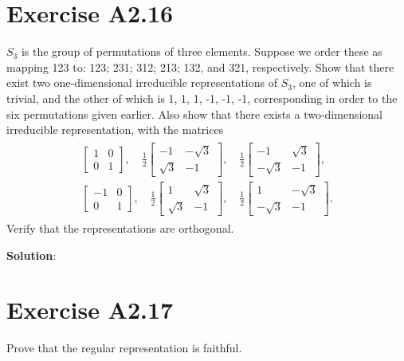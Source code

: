 \documentclass{book}
\begin{document}
\section*{Exercise A2.16}
    $S_3$ is the group of permutations of three elements. Suppose we order these as mapping 123 to: 123; 231; 312; 213; 132, and 321, respectively. Show that there exist two one-dimensional irreducible representations of $S_3$, one of which is trivial, and the other of which is 1, 1, 1, -1, -1, -1, corresponding in order to the six permutations given earlier. Also show that there exists a two-dimensional irreducible representation, with the matrices
    \begin{align}
    \begin{aligned}
        \begin{bmatrix}
            1 & 0 \\
            0 & 1
        \end{bmatrix}, \quad
        \frac{1}{2}
        \begin{bmatrix}
            -1 & -\sqrt{3} \\
            \sqrt{3} & -1
        \end{bmatrix}, \quad
        \frac{1}{2}
        \begin{bmatrix}
            -1 & \sqrt{3} \\
            -\sqrt{3} & -1
        \end{bmatrix}, \\
        \begin{bmatrix}
            -1 & 0 \\
            0 & 1
        \end{bmatrix}, \quad
        \frac{1}{2}
        \begin{bmatrix}
            1 & \sqrt{3} \\
            \sqrt{3} & -1
        \end{bmatrix}, \quad
        \frac{1}{2}
        \begin{bmatrix}
            1 & -\sqrt{3} \\
            -\sqrt{3} & -1
        \end{bmatrix}.
    \end{aligned}
    \end{align}
    Verify that the representations are orthogonal.
    
    \textbf{Solution}:

\section*{Exercise A2.17}
    Prove that the regular representation is faithful.
    
\end{document}
